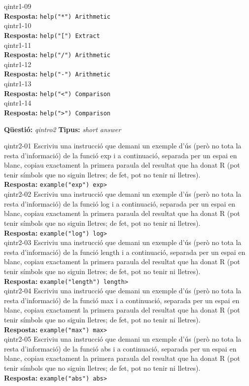 \documentclass[10pt]{article}
\newcommand{\answer}{\textbf{Resposta: }}
\newcommand{\newquestion}[2]{\noindent\textbf{Qüestió: }\emph{#1} \textbf{Tipus: }\emph{#2}\medskip}
\newcommand{\namequestion}{}
\begin{document}
\namequestion{qintr1-09}
\\ 
\answer{\verb?help("*") Arithmetic?}\\

\namequestion{qintr1-10}
\qintro1{el símbol [}\\ 
\answer{\verb?help("[") Extract?}\\

\namequestion{qintr1-11}
\\ 
\answer{\verb?help("/") Arithmetic?}\\

\namequestion{qintr1-12}
\\ 
\answer{\verb?help("-") Arithmetic?}\\

\namequestion{qintr1-13}
\\ 
\answer{\verb?help("<") Comparison?}\\

\namequestion{qintr1-14}
\\ 
\answer{\verb?help(">") Comparison?}\\

\newpage

\newquestion{qintro2}{short answer} 
\def\qintro2#1{Escriviu una instrucció que demani un exemple d'ús (però no tota la resta d'informació) #1 i a continuació, separada per un espai en blanc, copiau exactament la primera paraula del resultat que ha donat R (pot tenir símbols que no siguin lletres; de fet, pot no tenir ni lletres).}

\namequestion{qintr2-01}
\qintro2{de la funció exp}\\ 
\answer{\verb?example("exp") exp>?}\\

\namequestion{qintr2-02}
\qintro2{de la funció log}\\ 
\answer{\verb?example("log") log>?}\\

\namequestion{qintr2-03}
\qintro2{de la funció length}\\ 
\answer{\verb?example("length") length>?}\\

\namequestion{qintr2-04}
\qintro2{de la funció max}\\ 
\answer{\verb?example("max") max>?}\\

\namequestion{qintr2-05}
\qintro2{de la funció abs}\\ 
\answer{\verb?example("abs") abs>?}\\
\end{document}
